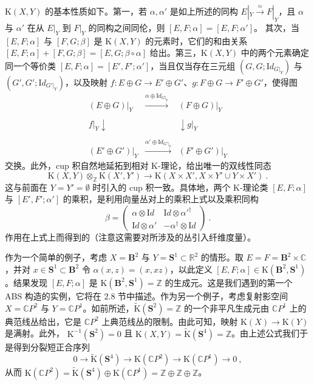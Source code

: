 \documentclass[11pt,a4paper]{ctexart}
\begin{document}
\({\mathrm K}(X,Y)\) 的基本性质如下。第一，若 \(\alpha,\alpha'\) 是如上所述的同构 \(E|_{Y}\stackrel{\approx}{\rightarrow}F|_{Y}\)，且 \(\alpha\) 与 \(\alpha'\) 在从 \(E|_{Y}\) 到 \(F|_{Y}\) 的同构之间同伦，则 \([E,F;\alpha]=[E,F;\alpha']\)。 其次，当 \([E,F;\alpha]\) 与 \([F,G;\beta]\) 是 \({\mathrm K}(X,Y)\) 的元素时，它们的和由关系 \([E,F;\alpha]+[F,G;\beta]=[E,G;\beta\circ\alpha]\) 给出。第三，\({\mathrm K}(X,Y)\) 中的两个元素确定同一个等价类 \([E,F;\alpha]=[E',F';\alpha']\)，当且仅当存在三元组 \((G,G;{\mathrm Id}_{G|_{Y}})\) 与 \((G',G';{\mathrm Id}_{G'|_{Y}})\)，以及映射 \(f: E\oplus G\rightarrow E'\oplus G'\)、\(g: F\oplus G\rightarrow F'\oplus G'\)，使得图 \[{\begin{array}{ccc}
(E\oplus G)|_{Y}&\stackrel{\alpha\oplus {\mathrm Id}_{G|_Y}}{\longrightarrow}&
(F\oplus G)|_{Y}\\&
&\\{\scriptstyle f|_{Y}}\downarrow& &\downarrow{\scriptstyle g|_{Y}}\\&
&\\(E'\oplus G')|_{Y}&\stackrel{\alpha'\oplus {\mathrm Id}_{G'|_Y}}
{\longrightarrow}&(F'\oplus
G')|_{Y}\end{array}}\] 交换。此外，cup 积自然地延拓到相对 K-理论，给出唯一的双线性同态 \[{\mathrm K}(X,Y)\otimes_{{\mathbb{Z}}}{\mathrm K}(X',Y')\longrightarrow
{\mathrm K}(X\times X',X\times Y'\cup Y\times X')\ .\] 这与前面在 \(Y=Y'=\emptyset\) 时引入的 cup 积一致。具体地，两个 K-理论类 \([E,F;\alpha]\) 与 \([E',F';\alpha']\) 的乘积，是利用向量丛对上的乘积上式以及乘积同构 \[\beta=\left( \begin{array}{cc}\alpha\otimes{\mathrm Id} & {\mathrm Id}
\otimes\alpha'^{\dagger}\\
{\mathrm Id}\otimes\alpha' &-\alpha^{\dagger}\otimes{\mathrm Id}
\end{array}\right)\ .\] 作用在上式上而得到的（注意这需要对所涉及的丛引入纤维度量）。

作为一个简单的例子，考虑 \(X={\mathbf B}^2\) 与 \(Y={\mathbf S}^1\subset {\mathbb{R}}^2\) 的情形。取 \(E=F={\mathbf B}^2\times
{\mathbb{C}}\)，并对 \(x\in {\mathbf S}^1\subset {\mathbf B}^2\) 令 \(\alpha(x,z)=(x,xz)\)，以此定义 \([E,F;\alpha]\in
{\mathrm K}({\mathbf B}^2, {\mathbf S}^1)\)。结果发现 \([E,F;\alpha]\) 是 \({\mathrm K}({\mathbf B}^2,
{\mathbf S}^1)= {\mathbb{Z}}\) 的生成元。这是我们遇到的第一个 ABS 构造的实例，它将在 2.8 节中描述。作为另一个例子，考虑复射影空间 \(X={\mathbb{C}} P^2\) 与 \(Y={\mathbb{C}}
P^1\)。如前所述，\(\widetilde{{\mathrm K}}({\mathbf S}^2)=
{\mathbb{Z}}\) 的一个非平凡生成元由 \({\mathbb{C}} P^1\) 上的典范线丛给出，它是 \({\mathbb{C}} P^2\) 上典范线丛的限制。由此可知，映射 \({\mathrm K}(X)\rightarrow {\mathrm K}(Y)\) 是满射。此外， \({\mathrm K}^{-1}({\mathbf S}^2)=0\) 且 \({\mathrm K}(X,Y)=\widetilde{{\mathrm K}}({\mathbf S}^4)={\mathbb{Z}}\)。由上述公式我们于是得到分裂短正合序列 \[0\longrightarrow \widetilde{{\mathrm K}}({\mathbf S}^4)\longrightarrow {\mathrm K}({\mathbb{C}} P^2)
\longrightarrow{\mathrm K}({\mathbb{C}} P^1)\longrightarrow 0\ ,\] 从而 \({\mathrm K}({\mathbb{C}} P^2)=\widetilde{{\mathrm K}}({\mathbf S}^4)\oplus{\mathrm K}({\mathbb{C}} P^1)
={\mathbb{Z}}\oplus{\mathbb{Z}}\oplus{\mathbb{Z}}\)。
\end{document}
